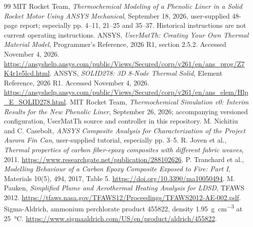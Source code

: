 \documentclass[oneside,openany]{amsdtx}
\begin{document}
\clearpage\begin{thebibliography}{99}
 MIT Rocket Team, \emph{Thermochemical Modeling of a Phenolic Liner in a Solid Rocket Motor Using ANSYS Mechanical}, September 18, 2026, user-supplied 48-page report; especially pp. 4--11, 21--25 and 35--37. Historical instructions are not current operating instructions.
 ANSYS, \emph{UserMatTh: Creating Your Own Thermal Material Model}, Programmer's Reference, 2026 R1, section 2.5.2. Accessed November 4, 2026. \url{https://ansyshelp.ansys.com/public/Views/Secured/corp/v261/en/ans_prog/Z7K4r1e5lcd.html}.
 ANSYS, \emph{SOLID278: 3D 8-Node Thermal Solid}, Element Reference, 2026 R1. Accessed November 4, 2026. \url{https://ansyshelp.ansys.com/public/Views/Secured/corp/v261/en/ans_elem/Hlp_E_SOLID278.html}.
 MIT Rocket Team, \emph{Thermochemical Simulation v0: Interim Results for the New Phenolic Liner}, September 26, 2026; accompanying versioned configuration, UserMatTh source and controller in this repository.
 M. Nichitiu and C. Casebolt, \emph{ANSYS Composite Analysis for Characterization of the Project Aurora Fin Can}, user-supplied tutorial, especially pp. 3--5.
 R. Joven et al., \emph{Thermal properties of carbon fiber-epoxy composites with different fabric weaves}, 2011. \url{https://www.researchgate.net/publication/288102626}.
 P. Tranchard et al., \emph{Modelling Behaviour of a Carbon Epoxy Composite Exposed to Fire: Part I}, Materials 10(5), 494, 2017, Table 5. \url{https://doi.org/10.3390/ma10050494}.
 M. Pauken, \emph{Simplified Plume and Aerothermal Heating Analysis for LDSD}, TFAWS 2012. \url{https://tfaws.nasa.gov/TFAWS12/Proceedings/TFAWS2012-AE-002.pdf}.
 Sigma-Aldrich, ammonium perchlorate product 455822, density \SI{1.95}{g.cm^{-3}} at \SI{25}{\degreeCelsius}. \url{https://www.sigmaaldrich.com/US/en/product/aldrich/455822}.
\end{thebibliography}
\end{document}
